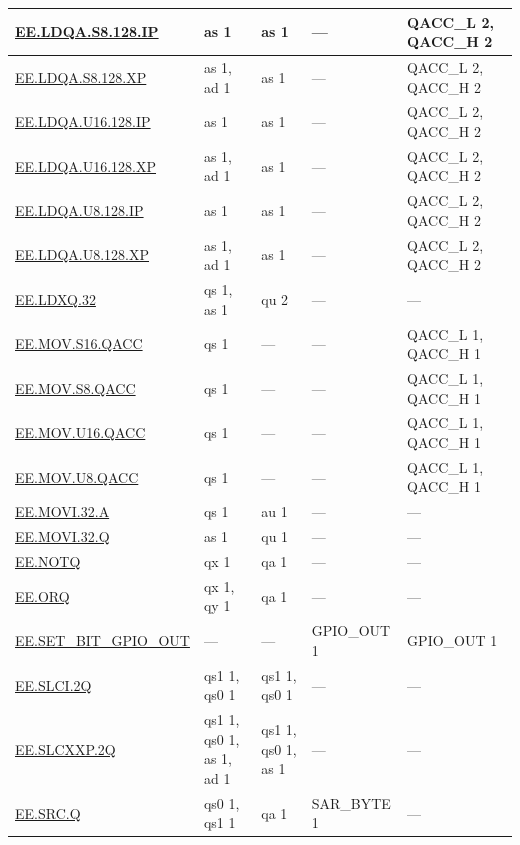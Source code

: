 \begin{longtable}[c]{|l|m{2.5cm}|m{2.5cm}|m{2.5cm}|m{2.5cm}|}
    \hyperref[instruction:EELDQAS8128IP]{EE.LDQA.S8.128.IP} & as 1 & as 1 & — & QACC\_L 2, QACC\_H 2\\\hline
    \hyperref[instruction:EELDQAS8128XP]{EE.LDQA.S8.128.XP} & as 1, ad 1 & as 1 & — & QACC\_L 2, QACC\_H 2\\\hline
    \hyperref[instruction:EELDQAU16128IP]{EE.LDQA.U16.128.IP} & as 1 & as 1 & — & QACC\_L 2, QACC\_H 2\\\hline
    \hyperref[instruction:EELDQAU16128XP]{EE.LDQA.U16.128.XP} & as 1, ad 1 & as 1 & — & QACC\_L 2, QACC\_H 2\\\hline
    \hyperref[instruction:EELDQAU8128IP]{EE.LDQA.U8.128.IP} & as 1 & as 1 & — & QACC\_L 2, QACC\_H 2\\\hline
    \hyperref[instruction:EELDQAU8128XP]{EE.LDQA.U8.128.XP} & as 1, ad 1 & as 1 & — & QACC\_L 2, QACC\_H 2\\\hline
    \hyperref[instruction:EELDXQ32]{EE.LDXQ.32} & qs 1, as 1 & qu 2 & — & — \\\hline
    \hyperref[instruction:EEMOVS16QACC]{EE.MOV.S16.QACC} & qs 1 & — & — & QACC\_L 1, QACC\_H 1\\\hline
    \hyperref[instruction:EEMOVS8QACC]{EE.MOV.S8.QACC} & qs 1 & — & — & QACC\_L 1, QACC\_H 1\\\hline
    \hyperref[instruction:EEMOVU16QACC]{EE.MOV.U16.QACC} & qs 1 & — & — & QACC\_L 1, QACC\_H 1\\\hline
    \hyperref[instruction:EEMOVU8QACC]{EE.MOV.U8.QACC} & qs 1 & — & — & QACC\_L 1, QACC\_H 1\\\hline
    \hyperref[instruction:EEMOVI32A]{EE.MOVI.32.A} & qs 1 & au 1 & — & — \\\hline
    \hyperref[instruction:EEMOVI32Q]{EE.MOVI.32.Q} & as 1 & qu 1 & — & — \\\hline
    \hyperref[instruction:EENOTQ]{EE.NOTQ} & qx 1 & qa 1 & — & — \\\hline
    \hyperref[instruction:EEORQ]{EE.ORQ} & qx 1, qy 1 & qa 1 & — & — \\\hline
    \hyperref[instruction:EESETBITGPIOOUT]{EE.SET\_BIT\_GPIO\_OUT} & — & — & GPIO\_OUT 1 & GPIO\_OUT 1 \\\hline
    \hyperref[instruction:EESLCI2Q]{EE.SLCI.2Q} & qs1 1, qs0 1 & qs1 1, qs0 1 & — & — \\\hline
    \hyperref[instruction:EESLCXXP2Q]{EE.SLCXXP.2Q} & qs1 1, qs0 1, as 1, ad 1 & qs1 1, qs0 1, as 1 & — & — \\\hline
    \hyperref[instruction:EESRCQ]{EE.SRC.Q} & qs0 1, qs1 1 & qa 1 & SAR\_BYTE 1 & — \\\hline

\end{longtable}
